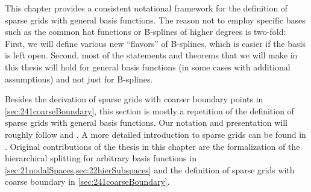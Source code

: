 
\label{chap:20sparseGrids}

This chapter provides a consistent notational framework
for the definition of sparse grids with general basis functions.
The reason not to employ specific bases such as the common hat functions
or B-splines of higher degrees is two-fold:
First, we will define various new ``flavors'' of B-splines,
which is easier if the basis is left open.
Second, most of the statements and theorems that we will make in this
thesis will hold for general basis functions
(in some cases with additional assumptions)
and not just for B-splines.

Besides the derivation of sparse grids with
coarser boundary points in \cref{sec:241coarseBoundary},
this section is mostly
a repetition of the definition of sparse grids with general basis functions.
Our notation and presentation will roughly follow
\cite{Pflueger10Spatially} and \cite{Garcke13Sparse}.
A more detailed introduction to sparse grids can be found in
\cite{Bungartz04Sparse}.
Original contributions of the thesis in this chapter
are the formalization of the hierarchical splitting for
arbitrary basis functions in \cref{sec:21nodalSpaces,sec:22hierSubspaces} and
the definition of sparse grids with coarse boundary in
\cref{sec:241coarseBoundary}.








\cleardoublepage
